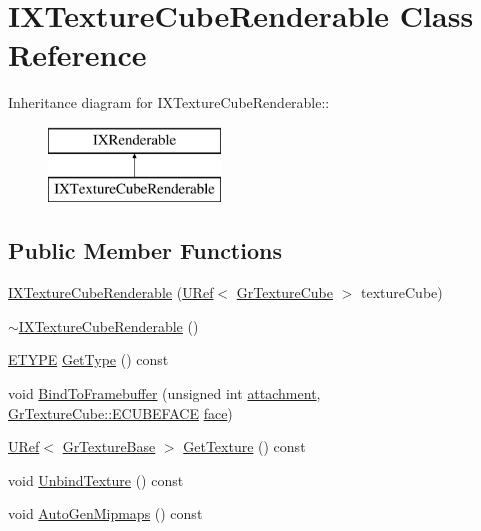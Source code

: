 \hypertarget{class_i_x_texture_cube_renderable}{
\section{IXTextureCubeRenderable Class Reference}
\label{class_i_x_texture_cube_renderable}
}
Inheritance diagram for IXTextureCubeRenderable::\begin{figure}[H]
\begin{center}
\leavevmode
\includegraphics[height=2cm]{class_i_x_texture_cube_renderable}
\end{center}
\end{figure}
\subsection*{Public Member Functions}
\begin{CompactItemize}
\item 
\hyperlink{class_i_x_texture_cube_renderable_23c67995138458458f43e56a3b9d92f0}{IXTextureCubeRenderable} (\hyperlink{class_u_ref}{URef}$<$ \hyperlink{class_gr_texture_cube}{GrTextureCube} $>$ textureCube)
\item 
\hyperlink{class_i_x_texture_cube_renderable_fefc7f1900ff256075a1f1b040bd64e8}{$\sim$IXTextureCubeRenderable} ()
\item 
\hyperlink{class_i_x_renderable_a83cb64592404acfb99afbc55a4ed8a8}{ETYPE} \hyperlink{class_i_x_texture_cube_renderable_f6645f105588b641271bbb4f33f72037}{GetType} () const 
\item 
void \hyperlink{class_i_x_texture_cube_renderable_01b1752841e74a9aa60229c855abcbac}{BindToFramebuffer} (unsigned int \hyperlink{glext__bak_8h_d8f97111cc6514af5f352219d1cceb40}{attachment}, \hyperlink{class_gr_texture_cube_49c6f83c73520edfce04f4eb5dcfe6a0}{GrTextureCube::ECUBEFACE} \hyperlink{glext_8h_676ca580c460c0154eb58200433d2a9e}{face})
\item 
\hyperlink{class_u_ref}{URef}$<$ \hyperlink{class_gr_texture_base}{GrTextureBase} $>$ \hyperlink{class_i_x_texture_cube_renderable_35c6be6d9d46593905c7bc41925115a5}{GetTexture} () const 
\item 
void \hyperlink{class_i_x_texture_cube_renderable_5c925a69c84be46731007be94bc415c6}{UnbindTexture} () const 
\item 
void \hyperlink{class_i_x_texture_cube_renderable_a3eac9a1a8de19d222ca98549a6f655f}{AutoGenMipmaps} () const 
\end{CompactItemize}


